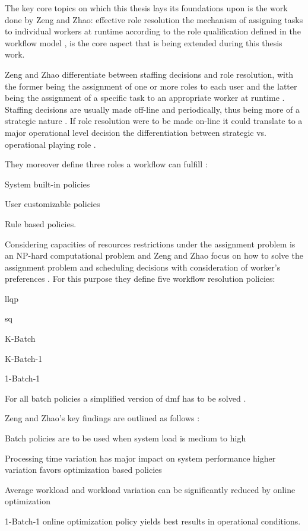 \documentclass{seal_thesis}
\begin{document}
The key core topics on which this thesis lays its foundations upon is the work done by Zeng and Zhao: effective role resolution \ie the mechanism of assigning tasks to individual workers at runtime according to the role qualification defined in the workflow model \cite{Zeng2005}, is the core aspect that is being extended during this thesis work.

Zeng and Zhao differentiate between staffing decisions and role resolution, with the former being the assignment of one or more roles to each user and the latter being the assignment of a specific task to an appropriate worker at runtime \cite{Zeng2005}. Staffing decisions are usually made off-line and periodically, thus being more of a strategic nature \cite{Zeng2005}. If role resolution were to be made on-line it could translate to a major operational level decision \ie the differentiation between strategic vs. operational playing role \cite{Zeng2005}.

They moreover define three roles a workflow can fulfill \cite{Zeng2005}:
\begin{enumerate*}
	\item System built-in policies
	\item User customizable policies
	\item Rule based policies.
\end{enumerate*}

Considering capacities of resources restrictions under the assignment problem is an NP-hard computational problem and Zeng and Zhao focus on how to solve the assignment problem and scheduling decisions with consideration of worker's preferences \cite{Zeng2005}. For this purpose they define five workflow resolution policies:
\begin{enumerate*}
	\item \gls{llqp}
	\item \gls{sq}
	\item K-Batch
	\item K-Batch-1
	\item 1-Batch-1
\end{enumerate*}

For all batch policies a simplified version of \gls{dmf} has to be solved \cite{Zeng2005}.

Zeng and Zhao's key findings are outlined as follows \cite{Zeng2005}:
\begin{enumerate*}
	\item Batch policies are to be used when system load is medium to high
	\item Processing time variation has major impact on system performance \ie higher variation favors optimization based policies
	\item Average workload and workload variation can be significantly reduced by online optimization
	\item 1-Batch-1 online optimization policy yields best results in operational conditions.
\end{enumerate*}
\end{document}
